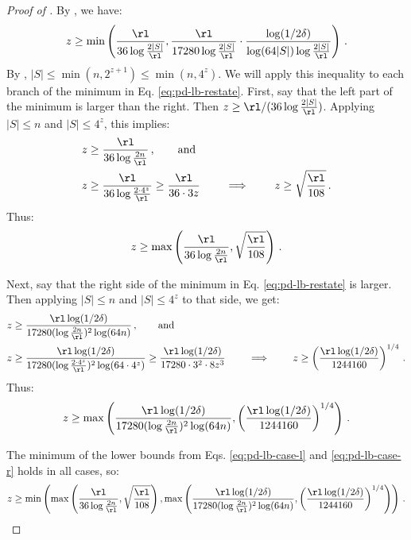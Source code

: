 \begin{proof}[Proof of ]
  By , we have:
  \begin{align}
    z \ge \min\left(
      \frac{\rl}{36 \log\frac{2 |S|}{\rl}},
      \frac{\rl}{17280 \log\frac{2 |S|}{\rl}} \cdot \frac{\log(1/2\delta)}{\log(64 |S|) \log\frac{2 |S|}{\rl}}
    \right) \,.\label{eq:pd-lb-restate}
  \end{align}
  By , $|S| \le \min(n, 2^{z+1}) \le \min(n, 4^z)$. We will apply this
  inequality to each branch of the minimum in Eq. \ref{eq:pd-lb-restate}. First, say that
  the left part of the minimum is larger than the right. Then $z \ge \rl / (36 \log\frac{2 |S|}{\rl})$.
  Applying $|S| \le n$ and $|S| \le 4^z$, this implies:
  \begin{align*}
    z &\ge \frac{\rl}{36 \log\frac{2 n}{\rl}} \,, \qquad \text{and} \\
    z &\ge \frac{\rl}{36 \log\frac{2 \cdot 4^z}{\rl}} \ge \frac{\rl}{36 \cdot 3 z} \qquad \implies \qquad z \ge \sqrt{\frac{\rl}{108}} \,.
  \end{align*}
  Thus:
  \begin{align}
    z \ge \max\left(\frac{\rl}{36 \log\frac{2 n}{\rl}}, \sqrt{\frac{\rl}{108}} \right) \,.\label{eq:pd-lb-case-l}
  \end{align}

  Next, say that the right side of the minimum in Eq. \ref{eq:pd-lb-restate} is larger.
  Then applying $|S| \le n$ and $|S| \le 4^z$ to that side, we get:
  \begin{align*}
    z &\ge \frac{\rl \log(1/2\delta)}{17280 (\log\frac{2 n}{\rl})^2 \log(64 n)} \,, \qquad \text{and} \\
    z &\ge \frac{\rl \log(1/2\delta)}{17280 (\log\frac{2 \cdot 4^z}{\rl})^2 \log(64 \cdot 4^z)} \ge \frac{\rl \log(1/2\delta)}{17280 \cdot 3^2 \cdot 8 z^3} \qquad \implies \qquad z \ge \left(\frac{\rl \log(1/2\delta)}{1244160}\right)^{1/4} \,.
  \end{align*}
  Thus:
  \begin{align}
    z \ge \max\left(
      \frac{\rl \log(1/2\delta)}{17280 (\log\frac{2 n}{\rl})^2 \log(64 n)},
      \left(\frac{\rl \log(1/2\delta)}{1244160}\right)^{1/4}
    \right) \,.\label{eq:pd-lb-case-r}
  \end{align}

  The minimum of the lower bounds from Eqs. \ref{eq:pd-lb-case-l} and \ref{eq:pd-lb-case-r}
  holds in all cases, so:
  \begin{align*}
    z \ge \min\left(\max\left(\frac{\rl}{36 \log\frac{2 n}{\rl}}, \sqrt{\frac{\rl}{108}}\right), \max\left(\frac{\rl \log(1/2\delta)}{17280 (\log\frac{2 n}{\rl})^2 \log(64n)},\left(\frac{\rl \log(1/2\delta)}{1244160}\right)^{1/4}\right)\right) \,.
  \end{align*}
\end{proof}


